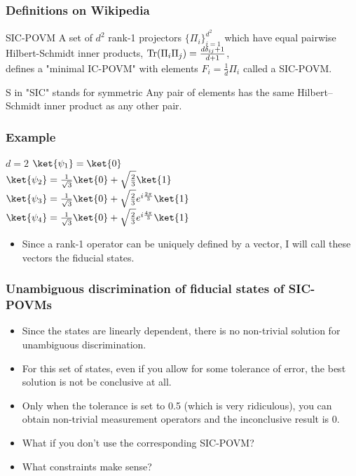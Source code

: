\documentclass{beamer}
\begin{document}
\begin{frame}
  \frametitle{Definitions on Wikipedia}
  \begin{block}{SIC-POVM}
    A set of $d^2$ rank-1 projectors ${\{\Pi_{i}\}^{d^2}_{i=1}}$
    which have equal pairwise Hilbert-Schmidt inner products,
    $\textnormal{Tr} (\Pi_{i}\Pi_{j})=\frac{d\delta_{ij}+1}{d+1}$,\\
    defines a "minimal IC-POVM" with elements $F_{i}=\frac{1}{d}\Pi_{i}$
    called a SIC-POVM.
  \end{block}
  \begin{alertblock}{S in "SIC" stands for symmetric}
    Any pair of elements has the same Hilbert–Schmidt inner product as any other pair.
  \end{alertblock}
\end{frame}

\begin{frame}
  \frametitle{Example}
  \begin{block}{$d = 2$}
    $\ket{\psi_{1}} = \ket{0}$\\
    $\ket{\psi_{2}} = \frac{1}{\sqrt{3}}\ket{0} + \sqrt{\frac{2}{3}}\ket{1}$\\
    $\ket{\psi_{3}} = \frac{1}{\sqrt{3}}\ket{0} + \sqrt{\frac{2}{3}} e^{i\frac{2\pi}{3}}\ket{1}$\\
    $\ket{\psi_{4}} = \frac{1}{\sqrt{3}}\ket{0} + \sqrt{\frac{2}{3}} e^{i\frac{4\pi}{3}}\ket{1}$\\
  \end{block}
  \begin{itemize}
    \item Since a rank-1 operator can be uniquely defined by a vector, I will call these vectors the fiducial states.
  \end{itemize}
\end{frame}

\begin{frame}
  \frametitle{Unambiguous discrimination of fiducial states of SIC-POVMs}
  \begin{itemize}
    \item Since the states are linearly dependent, there is no non-trivial solution for unambiguous discrimination.
    \item For this set of states, even if you allow for some tolerance of error, the best solution is not be conclusive at all.
    \item Only when the tolerance is set to 0.5 (which is very ridiculous), you can obtain non-trivial measurement
          operators and the inconclusive result is 0.
    \item What if you don't use the corresponding SIC-POVM?
    \item What constraints make sense?
  \end{itemize}
\end{frame}
\end{document}
